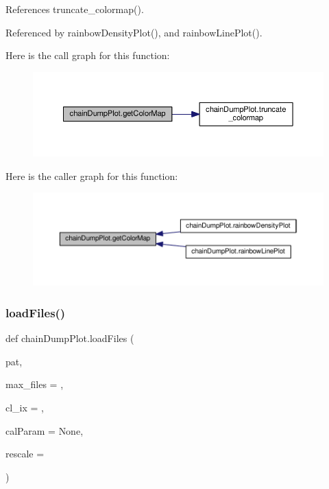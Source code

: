 References truncate\+\_\+colormap().



Referenced by rainbow\+Density\+Plot(), and rainbow\+Line\+Plot().

Here is the call graph for this function\+:
\nopagebreak
\begin{figure}[H]
\begin{center}
\leavevmode
\includegraphics[width=350pt]{namespacechainDumpPlot_abebc3286beb684f132f59c5e88dd80c3_cgraph}
\end{center}
\end{figure}
Here is the caller graph for this function\+:
\nopagebreak
\begin{figure}[H]
\begin{center}
\leavevmode
\includegraphics[width=350pt]{namespacechainDumpPlot_abebc3286beb684f132f59c5e88dd80c3_icgraph}
\end{center}
\end{figure}
\mbox{\label{namespacechainDumpPlot_a2f615eaca5038b7db9b888ff93dfda6d}} 
\subsubsection{\texorpdfstring{load\+Files()}{loadFiles()}}
{\footnotesize\ttfamily def chain\+Dump\+Plot.\+load\+Files (\begin{DoxyParamCaption}\item[{}]{pat,  }\item[{}]{max\+\_\+files = {},  }\item[{}]{cl\+\_\+ix = {},  }\item[{}]{cal\+Param = {\ttfamily None},  }\item[{}]{rescale = {} }\end{DoxyParamCaption})}

